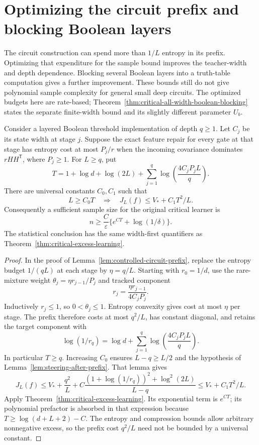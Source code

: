 \section{Optimizing the circuit prefix and blocking Boolean layers}
\label{sec:critical-optimized-blocking}

The circuit construction can spend more than $1/L$ entropy in its
prefix. Optimizing that expenditure for the sample bound improves the
teacher-width and depth dependence. Blocking several Boolean layers
into a truth-table computation gives a further improvement. These
bounds still do not give polynomial sample complexity for general
small deep circuits. The optimized budgets here are rate-based;
Theorem~\ref{thm:critical-all-width-boolean-blocking} states the
separate finite-width bound and its slightly different parameter $U_b$.

\begin{proposition}
\label{prop:critical-optimized-prefix-budget}
Consider a layered Boolean threshold implementation of depth $q\ge1$.
Let $C_j$ be its state width at stage $j$. Suppose the exact feature
repair for every gate at that stage has entropy cost at most $P_j/r$
when the incoming covariance dominates $rHH^{\mathsf T}$, where
$P_j\ge1$. For $L\ge q$, put
\[
 T=1+\log d+\log(2L)+
          \sum_{j=1}^q\log\left(\frac{4C_jP_jL}{q}\right).
\]
There are universal constants $C_0,C_1$ such that
\[
 L\ge C_0T\quad\Longrightarrow\quad
 J_L(f)\le V_*+C_1T^2/L.
\]
Consequently a sufficient sample size for the original critical
learner is
\[
 n\ge\frac{C}{\varepsilon}
       \{e^{CT}+\log(1/\delta)\}.
\]
The statistical conclusion has the same width-first quantifiers as
Theorem~\ref{thm:critical-excess-learning}.
\end{proposition}

\begin{proof}
In the proof of Lemma~\ref{lem:controlled-circuit-prefix}, replace
the entropy budget $1/(qL)$ at each stage by $\eta=q/L$.
Starting with $r_0=1/d$, use the rare-mixture weight
$\theta_j=\eta r_{j-1}/P_j$ and tracked component
\[
 r_j=\frac{\eta r_{j-1}}{4C_jP_j}.
\]
Inductively $r_j\le1$, so $0<\theta_j\le1$.
Entropy convexity gives cost at most $\eta$ per stage. The prefix
therefore costs at most $q^2/L$, has constant diagonal, and retains
the target component with
\[
 \log(1/r_q)=\log d+
       \sum_{j=1}^q\log\left(\frac{4C_jP_jL}{q}\right).
\]
In particular $T\ge q$. Increasing $C_0$ ensures
$L-q\ge L/2$ and the hypothesis of
Lemma~\ref{lem:steering-after-prefix}. That lemma gives
\[
 J_L(f)\le V_*+\frac{q^2}{L}
       +C\frac{(1+\log(1/r_q))^2+\log^2(2L)}{L-q}
 \le V_*+C_1T^2/L.
\]
Apply Theorem~\ref{thm:critical-excess-learning}.
Its exponential term is $e^{CT}$; its polynomial prefactor is
absorbed in that expression because $T\ge\log(d+L+2)-C$.
The entropy and compression bounds allow arbitrary nonnegative
excess, so the prefix cost $q^2/L$ need not be bounded by a
universal constant.
\end{proof}

